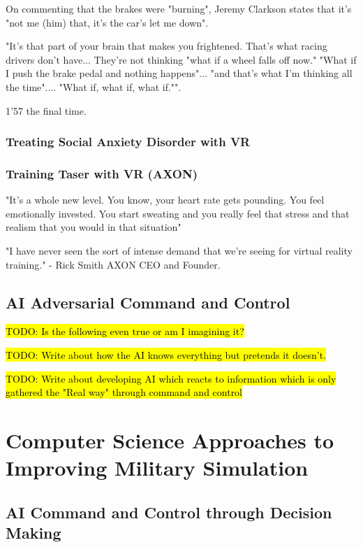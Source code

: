 \documentclass{article}
\begin{document}
On commenting that the brakes were "burning", Jeremy Clarkson states that it's "not me (him) that, it's the car's let me down". 

"It's that part of your brain that makes you frightened. That's what racing drivers don't have... They're not thinking "what if a wheel falls off now." "What if I push the brake pedal and nothing happens"... "and that's what I'm thinking all the time".... "What if, what if, what if."".

1'57 the final time.

\subsubsection{Treating Social Anxiety Disorder with VR}

\subsubsection{Training Taser with VR (AXON)}


"It's a whole new level. You know, your heart rate gets pounding. You feel emotionally invested. You start sweating and you really feel that stress and that realism that you would in that situation"

"I have never seen the sort of intense demand that we're seeing for virtual reality training." - Rick Smith AXON CEO and Founder.


\subsection{AI Adversarial Command and Control}

\hl{TODO: Is the following even true or am I imagining it?}

\hl{TODO: Write about how the AI knows everything but pretends it doesn't.}

\hl{TODO: Write about developing AI which reacts to information which is only gathered the "Real way" through command and control}

\section{Computer Science Approaches to Improving Military Simulation}

\subsection{AI Command and Control through Decision Making}
\end{document}
